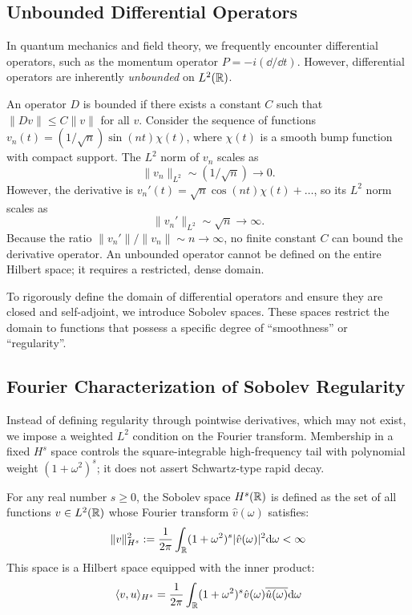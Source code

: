 \subsection{Unbounded Differential Operators}

In quantum mechanics and field theory, we frequently encounter differential operators, such as the momentum operator $P = -i(\dd/\dd t)$. However, differential operators are inherently \textit{unbounded} on $L^2(\mathbb{R})$.

\begin{remark}
An operator $D$ is bounded if there exists a constant $C$ such that $\|Dv\| \leq C\|v\|$ for all $v$. Consider the sequence of functions $v_n(t) = (1/\sqrt{n}) \sin(nt) \chi(t)$, where $\chi(t)$ is a smooth bump function with compact support.
The $L^2$ norm of $v_n$ scales as
\[
\|v_n\|_{L^2} \sim (1/\sqrt{n}) \to 0.
\]
However, the derivative is $v_n'(t) = \sqrt{n} \cos(nt) \chi(t) + \dots$, so its $L^2$ norm scales as
\[
\|v_n'\|_{L^2} \sim \sqrt{n} \to \infty.
\]
Because the ratio $\|v_n'\| / \|v_n\| \sim n \to \infty$, no finite constant $C$ can bound the derivative operator. An unbounded operator cannot be defined on the entire Hilbert space; it requires a restricted, dense domain.
\end{remark}

To rigorously define the domain of differential operators and ensure they are closed and self-adjoint, we introduce Sobolev spaces. These spaces restrict the domain to functions that possess a specific degree of ``smoothness'' or ``regularity''.

\subsection{Fourier Characterization of Sobolev Regularity}

Instead of defining regularity through pointwise derivatives, which may
not exist, we impose a weighted $L^2$ condition on the Fourier transform.
Membership in a fixed $H^s$ space controls the square-integrable
high-frequency tail with polynomial weight $(1+\omega^2)^s$; it does not
assert Schwartz-type rapid decay.

\begin{definition}
For any real number $s \geq 0$, the Sobolev space $H^s(\mathbb{R})$ is defined as the set of all functions $v \in L^2(\mathbb{R})$ whose Fourier transform $\hat{v}(\omega)$ satisfies:
\begin{equation}
\|v\|_{H^s}^2 := \frac{1}{2\pi}\int_{\mathbb{R}} (1 + \omega^2)^s |\hat{v}(\omega)|^2 \mathrm{d} \omega < \infty
\end{equation}
This space is a Hilbert space equipped with the inner product:
\begin{equation}
\langle v, u \rangle_{H^s} = \frac{1}{2\pi}\int_{\mathbb{R}} (1 + \omega^2)^s \hat{v}(\omega) \overline{\hat{u}(\omega)} \mathrm{d} \omega
\end{equation}

\end{definition}

